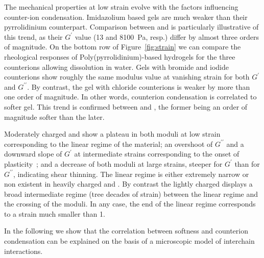 \documentclass[journal=jacsat,manuscript=article]{achemso}
\begin{document}
The mechanical properties at low strain evolve with the factors influencing counter-ion condensation. Imidazolium based gels are much weaker than their pyrrolidinium counterpart. Comparison between  and  is particularly illustrative of this trend, as their $G^\prime$ value (13 and \SI{8100}{\pascal}, resp.) differ by almost three orders of magnitude. On the bottom row of Figure~\ref{fig:strain} we can compare the rheological responses of Poly(pyrrolidinium)-based hydrogels for the three counterions allowing dissolution in water. Gels with bromide and iodide counterions show roughly the same modulus value at vanishing strain for both $G^\prime$ and $G^{\prime\prime}$. By contrast, the gel with chloride counterions is weaker by more than one order of magnitude. In other words, counterion condensation is correlated to softer gel. This trend is confirmed between  and , the former being an order of magnitude softer than the later.

Moderately charged  and  show a plateau in both moduli at low strain corresponding to the linear regime of the material; an overshoot of $G^{\prime\prime}$ and a downward slope of $G^\prime$ at intermediate strains corresponding to the onset of plasticity~\cite{Hyun2011}; and a decrease of both moduli at large strains, steeper for $G^\prime$ than for $G^{\prime\prime}$, indicating shear thinning. The linear regime is either extremely narrow or non existent in heavily charged  and . By contrast the lightly charged  displays a broad intermediate regime (tree decades of strain) between the linear regime and the crossing of the moduli. In any case, the end of the linear regime corresponds to a strain much smaller than 1.

In the following we show that the correlation between softness and counterion condensation can be explained on the basis of a microscopic model of interchain interactions.




\end{document}
